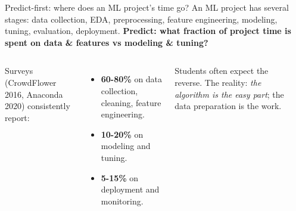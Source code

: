 \documentclass[aspectratio=169]{beamer}
\begin{document}
\begin{frame}{Predict-first: where does an ML project's time go?}
  An ML project has several stages: data collection, EDA, preprocessing, feature engineering, modeling, tuning, evaluation, deployment.
  \vfill
  \pause
  \textbf{Predict: what fraction of project time is spent on data \& features vs modeling \& tuning?}
  \pause
  \vfill
  \begin{columns}[T]
    Surveys (CrowdFlower 2016, Anaconda 2020) consistently report:
    \begin{itemize}\small
      \item \textbf{60-80\%} on data collection, cleaning, feature engineering.
      \item \textbf{10-20\%} on modeling and tuning.
      \item \textbf{5-15\%} on deployment and monitoring.
    \end{itemize}
    \vskip 4pt
    \footnotesize Students often expect the reverse. The reality: \emph{the algorithm is the easy part}; the data preparation is the work.
    \begin{center}
    \end{center}
  \end{columns}
\end{frame}
\end{document}
